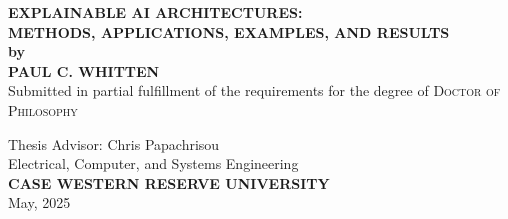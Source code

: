 \documentclass[12pt, oneside]{book}
\begin{document}


\begin{titlepage}
\begin{center}
\Large{\bfseries\MakeUppercase{
    Explainable AI Architectures:\\Methods, Applications, Examples, and Results\\
 }}
 \vspace{.5cm}
 \large{\bfseries{by}}\\
 \vspace{.5cm}
\Large{\bfseries\MakeUppercase{Paul C. Whitten}}\\

\vspace{1cm}
\large{Submitted in partial fulfillment of the requirements for the degree of \textsc{Doctor of Philosophy}}\\[0.75cm]
\vfill

{Thesis Advisor: Chris Papachrisou} \vspace{0.4cm} \\[.75cm]
 \vfill
\large{Electrical, Computer, and Systems Engineering}\\[.75cm]
\vfill
\large{\bfseries\MakeUppercase{Case Western Reserve University}}\\[0.5cm]
\vfill
{May, 2025}
\end{center}
\end{titlepage}
\end{document}
